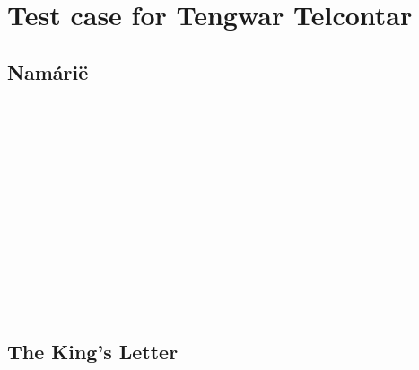 \documentclass[11pt,a4paper]{article}
\begin{document}
\section*{Test case for Tengwar Telcontar}

\subsection*{Namárië}
\tengtelc
      \\
        \\
     \\
        \\
   \\
        \\
       \\
      \\
     \\
        \\
       \\
    

\subsection*{The King’s Letter}
\begin{center}
\tengtelcb
   \\
   \\
   \\
     \\
    \\
     \\
     \\
       \\
    \\
    \\
\end{center}
\end{document}
